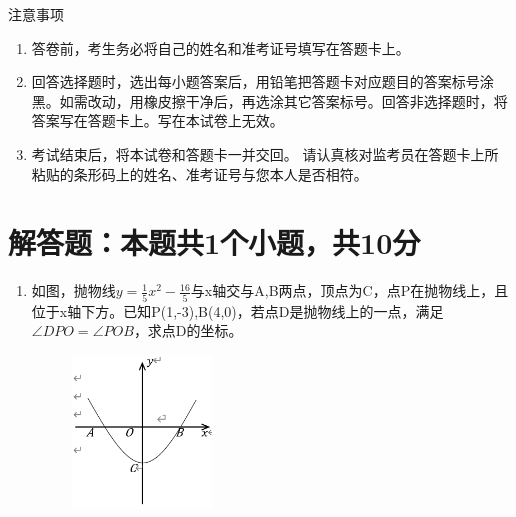 \documentclass[12pt,twoside,space]{ctexart}
\begin{document}
\juemi
{}
{\heiti 注意事项}
\begin{enumerate}[itemsep=-0.3em,topsep=0pt]
\item 答卷前，考生务必将自己的姓名和准考证号填写在答题卡上。
\item 回答选择题时，选出每小题答案后，用铅笔把答题卡对应题目的答案标号涂黑。如需改动，用橡皮擦干净后，再选涂其它答案标号。回答非选择题时，将答案写在答题卡上。写在本试卷上无效。
\item 考试结束后，将本试卷和答题卡一并交回。
	请认真核对监考员在答题卡上所粘贴的条形码上的姓名、准考证号与您本人是否相符。
\end{enumerate}
\section{解答题：本题共1个小题，共10分}
\begin{enumerate}[itemsep=0.2em,topsep=0pt]
\item
如图，抛物线$ y=\frac{1}{5}x^2-\frac{16}{5} $与x轴交与A,B两点，顶点为C，点P在抛物线上，且位于x轴下方。已知P(1,-3),B(4,0)，若点D是抛物线上的一点，满足$ \angle DPO=\angle POB $，求点D的坐标。
\begin{figure}[H]
                      \centering
                      \includegraphics[width=10em]{288793-1642408835-2.jpg}
\end{figure}
\end{enumerate}

\clearpage
\end{document}
